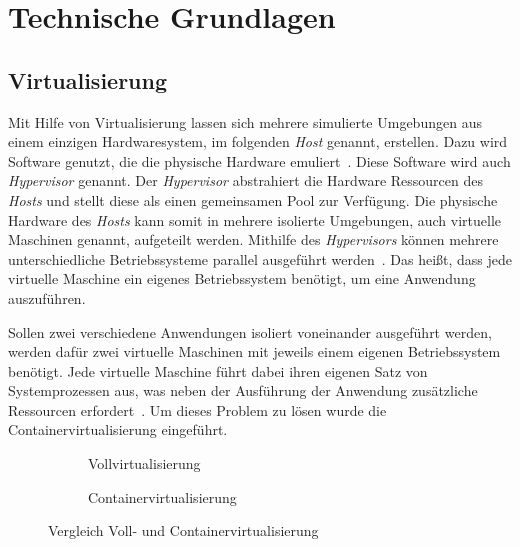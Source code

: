 \chapter{Technische Grundlagen}\label{ch:technical-basics}

\section{Virtualisierung}

Mit Hilfe von Virtualisierung lassen sich mehrere simulierte Umgebungen aus einem einzigen Hardwaresystem, im folgenden \textit{Host} genannt, erstellen.
Dazu wird Software genutzt, die die physische Hardware emuliert~\cite{virtualization-techtarget}. Diese Software wird auch \textit{Hypervisor} genannt.
Der \textit{Hypervisor} abstrahiert die Hardware Ressourcen des \textit{Hosts} und stellt diese als einen gemeinsamen Pool zur Verfügung.
Die physische Hardware des \textit{Hosts} kann somit in mehrere isolierte Umgebungen, auch virtuelle Maschinen genannt, aufgeteilt werden.
Mithilfe des \textit{Hypervisors} können mehrere unterschiedliche Betriebssysteme parallel ausgeführt werden~\cite{virtualization-red-hat, hypervisor-red-hat}.
Das heißt, dass jede virtuelle Maschine ein eigenes Betriebssystem benötigt, um eine Anwendung auszuführen.

Sollen zwei verschiedene Anwendungen isoliert voneinander ausgeführt werden, werden dafür zwei virtuelle Maschinen mit jeweils einem eigenen Betriebssystem benötigt.
Jede virtuelle Maschine führt dabei ihren eigenen Satz von Systemprozessen aus, was neben der Ausführung der Anwendung zusätzliche Ressourcen erfordert~\cite{kubernetes-in-action-introduction}.
Um dieses Problem zu lösen wurde die Containervirtualisierung eingeführt.

\begin{figure}
      \centering
      \begin{subfigure}{.5\textwidth}
            \centering
            
            \caption{Vollvirtualisierung}
            \label{fig:full-virtualization}
      \end{subfigure}%
      \begin{subfigure}{.5\textwidth}
            \centering
            
            \caption{Containervirtualisierung}
            \label{fig:container-virtualization}
      \end{subfigure}
      \caption{Vergleich Voll- und Containervirtualisierung}
      \label{fig:virtualization-comparison}
\end{figure}

